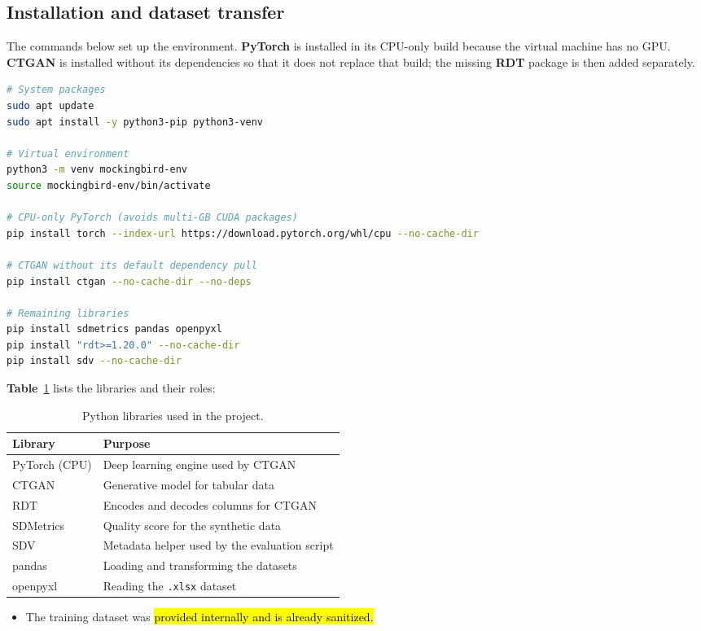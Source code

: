 \documentclass[11pt,a4paper]{article}
\begin{document}
\subsection{Installation and dataset transfer}
The commands below set up the environment. \textbf{PyTorch} is installed in its CPU-only build because the virtual machine has no GPU. \textbf{CTGAN} is installed without its dependencies so that it does not replace that build; the missing \textbf{RDT} package is then added separately.

\begin{lstlisting}[language=bash]
# System packages
sudo apt update
sudo apt install -y python3-pip python3-venv

# Virtual environment
python3 -m venv mockingbird-env
source mockingbird-env/bin/activate

# CPU-only PyTorch (avoids multi-GB CUDA packages)
pip install torch --index-url https://download.pytorch.org/whl/cpu --no-cache-dir

# CTGAN without its default dependency pull
pip install ctgan --no-cache-dir --no-deps

# Remaining libraries
pip install sdmetrics pandas openpyxl
pip install "rdt>=1.20.0" --no-cache-dir
pip install sdv --no-cache-dir
\end{lstlisting}

\textbf{Table}~\ref{tab:libraries} lists the libraries and their roles:
\begin{table}[H]
\centering
\begin{tabular}{@{}p{3.2cm}p{9cm}@{}}
\toprule
Library & Purpose\\
\midrule
PyTorch (CPU) & Deep learning engine used by CTGAN\\
CTGAN & Generative model for tabular data\\
RDT & Encodes and decodes columns for CTGAN\\
SDMetrics & Quality score for the synthetic data\\
SDV & Metadata helper used by the evaluation script\\
pandas & Loading and transforming the datasets\\
openpyxl & Reading the \texttt{.xlsx} dataset\\
\bottomrule
\end{tabular}
\caption{Python libraries used in the project.}\label{tab:libraries}
\end{table}

\begin{itemize}
    \item The training dataset was \hl{provided internally and is already sanitized.}
\end{itemize}
\end{document}
